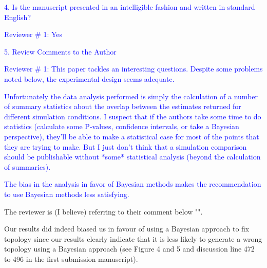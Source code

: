 \documentclass[11pt]{letter}
\begin{document}
\begin{letter}{}
\textcolor{blue}{4. Is the manuscript presented in an intelligible fashion and written in standard English?}

\textcolor{blue}{Reviewer $\#$ 1: Yes}

\textcolor{blue}{5. Review Comments to the Author}

\textcolor{blue}{Reviewer $\#$ 1: This paper tackles an interesting questions. Despite some problems noted below, the experimental design seems adequate.}


\textcolor{blue}{Unfortunately the data analysis performed is simply the calculation of a number of summary statistics about the overlap between the estimates returned for different simulation conditions. I suspect that if the authors take some time to do statistics (calculate some P-values, confidence intervals, or take a Bayesian perspective), they'll be able to make a statistical case for most of the points that they are trying to make. But I just don't think that a simulation comparison should be publishable without *some* statistical analysis (beyond the calculation of summaries).}




\textcolor{blue}{The bias in the analysis in favor of Bayesian methods makes the recommendation to use Bayesian methods less satisfying.}


The reviewer is (I believe) referring to their comment below "". 

Our results did indeed biased us in favour of using a Bayesian approach to fix topology since our results clearly indicate that it is less likely to generate a wrong topology using a Bayesian approach (see Figure 4 and 5 and discussion line 472 to 496 in the first submission manuscript).


\end{letter}
\end{document}
